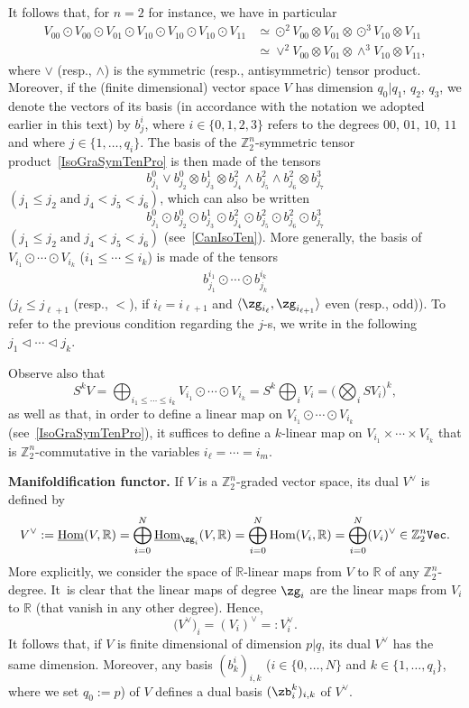 \documentclass[10pt,a4paper]{amsart}
\newcommand{\op}[1]{\operatorname{#1}}
\newcommand{\R}{{\mathbb R}}
\newcommand{\Z}{{\mathbb Z}}
\def\ul{\underline}
\def\la{\langle}
\def\ul{\underline}
\newcommand{\0}{\otimes}
\numberwithin{equation}{section}
\begin{document}
It follows that, for $n=2$ for instance, we have in particular
\begin{align}
V_{00}\odot V_{00}\odot V_{01}\odot V_{10}\odot V_{10}\odot V_{10}\odot V_{11}&\simeq \odot^2 V_{00}\0 V_{01}\0\odot^3V_{10}\0 V_{11}\nonumber
\\
&\simeq\vee^2 V_{00}\0 V_{01}\0\wedge^3V_{10}\0 V_{11},\label{IsoGraSymTenPro}
\end{align}
where $\vee$ (resp., $\wedge$) is the symmetric (resp., antisymmetric) tensor product. Moreover, if the (finite dimensional) vector space $V$ has dimension $q_0|q_1$, $q_2$, $q_3$, we denote the vectors of its basis (in accordance with the notation we adopted earlier in this text) by $b^i_{j}$, where $i\in\{0,1,2,3\}$ refers to the degrees $00$, $01$, $10$, $11$ and where $j\in\{1,\dots,q_i\}$. The basis of the $\Z_2^n$-symmetric tensor product~\eqref{IsoGraSymTenPro} is then made of the tensors
\[
b^0_{j_1}\vee b^0_{j_2}\0 b^1_{j_3}\0 b^2_{j_4}\wedge b^2_{j_5}\wedge b^2_{j_6}\0 b^3_{j_7}
\]
$(j_1\le j_2\;\text{and}\;j_4<j_5<j_6)$, which can also be written
\[
b^0_{j_1}\odot b^0_{j_2}\odot b^1_{j_3}\odot b^2_{j_4}\odot b^2_{j_5}\odot b^2_{j_6}\odot b^3_{j_7}
\]
$(j_1\le j_2\;\text{and}\;j_4<j_5<j_6)$ (see~\eqref{CanIsoTen}). More generally, the basis of $V_{i_1}\odot\cdots\odot V_{i_k}$ ($i_1\le\cdots\le i_k$) is made of the tensors
\begin{gather}\label{BasGraSymTenAlg}
b^{i_1}_{j_1}\odot\cdots\odot b^{i_k}_{j_k}
\end{gather}
($j_\ell\le j_{\ell+1}$ (resp., $<$), if $i_\ell = i_{\ell+1}$ and $\la\zg_{i_\ell},\zg_{i_{\ell+1}}\rangle$ even (resp., odd)). To refer to the previous condition regarding the $j$-s, we write in the following $j_1\lhd\cdots\lhd j_k$.

Observe also that
\[
S^kV=\bigoplus_{i_1\le\cdots\le i_k}V_{i_1}\odot\cdots\odot V_{i_k}=S^k\bigoplus_i V_i=\bigg(\bigotimes_i SV_{i}\bigg)^k,
\]
as well as that, in order to define a linear map on $V_{i_1}\odot\cdots\odot V_{i_k}$ (see~\eqref{IsoGraSymTenPro}), it suffices to define a $k$-linear map on $V_{i_1}\times\cdots\times V_{i_k}$ that is $\Z_2^n$-commutative in the variables $i_\ell=\cdots=i_m$.

\medskip\noindent
{\bf Manifoldification functor.} If $V$ is a $\Z_2^n$-graded vector space, its dual $V^\vee$ is defined by
\[
V^\vee:=\ul{\op{Hom}}(V,\R)=\bigoplus_{i=0}^N\ul{\op{Hom}}_{\zg_i}(V,\R) =\bigoplus_{i=0}^N\op{Hom}(V_i,\R)=\bigoplus_{i=0}^N(V_i)^\vee\in\Z_2^n\tt Vec.
\]
More explicitly, we consider the space of $\R$-linear maps from $V$ to $\R$ of any $\Z_2^n$-degree. It~is clear that the linear maps of degree $\zg_i$ are the linear maps from $V_i$ to $\R$ (that vanish in any other degree). Hence,
\[
\big(V^\vee\big)_i=(V_i)^\vee=:V_i^\vee.
\]
It follows that, if $V$ is finite dimensional of dimension $p|\ul q$, its dual $V^\vee$ has the same dimension. Moreover, any basis $(b^i_k)_{i,k}$ ($i\in\{0,\dots, N\}$ and $k\in\{1,\dots, q_i\}$, where we set $q_0:= p$) of $V$ defines a dual basis $(\zb^k_i)_{i,k}$ of $V^\vee$.
\end{document}
